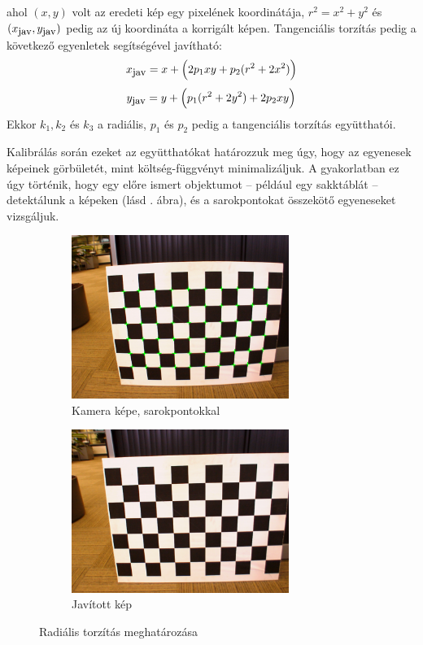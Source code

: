 ahol $(x,y)$ volt az eredeti kép egy pixelének koordinátája, $r^2 = x^2 + y^2$ és $(x_{\hbox{\small jav}}, y_{\hbox{\small jav}})$ pedig az új koordináta a korrigált képen. Tangenciális torzítás pedig a következő egyenletek segítségével javítható:
\[x_{\hbox{\small jav}} = x + \Big(2p_1xy + p_2(r^2+2x^2)\Big)\]
\[y_{\hbox{\small jav}} = y + \Big(p_1(r^2+2y^2) + 2p_2xy\Big)\]
Ekkor $k_1, k_2$ és $k_3$ a radiális, $p_1$ és $p_2$ pedig a tangenciális torzítás együtthatói.

Kalibrálás során ezeket az együtthatókat határozzuk meg úgy, hogy az egyenesek képeinek görbületét, mint költség-függvényt minimalizáljuk. A gyakorlatban ez úgy történik, hogy egy előre ismert objektumot -- például egy sakktáblát -- detektálunk a képeken (lásd . ábra), és a sarokpontokat összekötő egyeneseket vizsgáljuk.

\begin{figure}[tbh]
\centering
\begin{subfigure}[b]{0.49\linewidth}
	\centering
	\includegraphics[width=200pt]{figures/distorted.png}
	\caption{Kamera képe, sarokpontokkal}
  \end{subfigure}
\begin{subfigure}[b]{0.49\linewidth}
	\centering
	\includegraphics[width=200pt]{figures/undistorted.png}
	\caption{Javított kép}
  \end{subfigure}
\caption{Radiális torzítás meghatározása \cite{pinhole-model} \label{fig:chessboards}}
\end{figure}

